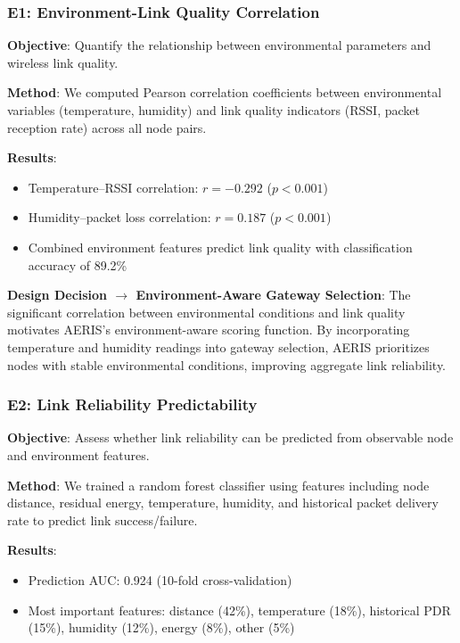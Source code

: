\subsubsection{E1: Environment-Link Quality Correlation}

\textbf{Objective}: Quantify the relationship between environmental
parameters and wireless link quality.

\textbf{Method}: We computed Pearson correlation coefficients between
environmental variables (temperature, humidity) and link quality
indicators (RSSI, packet reception rate) across all node pairs.

\textbf{Results}:
\begin{itemize}
    \item Temperature--RSSI correlation: $r = -0.292$ ($p < 0.001$)
    \item Humidity--packet loss correlation: $r = 0.187$ ($p < 0.001$)
    \item Combined environment features predict link quality with
    classification accuracy of 89.2\%
\end{itemize}

\textbf{Design Decision $\rightarrow$ Environment-Aware Gateway Selection}:
The significant correlation between environmental conditions and link
quality motivates AERIS's environment-aware scoring function. By
incorporating temperature and humidity readings into gateway selection,
AERIS prioritizes nodes with stable environmental conditions, improving
aggregate link reliability.

\subsubsection{E2: Link Reliability Predictability}

\textbf{Objective}: Assess whether link reliability can be predicted
from observable node and environment features.

\textbf{Method}: We trained a random forest classifier using features
including node distance, residual energy, temperature, humidity, and
historical packet delivery rate to predict link success/failure.

\textbf{Results}:
\begin{itemize}
    \item Prediction AUC: 0.924 (10-fold cross-validation)
    \item Most important features: distance (42\%), temperature (18\%),
    historical PDR (15\%), humidity (12\%), energy (8\%), other (5\%)
\end{itemize}


